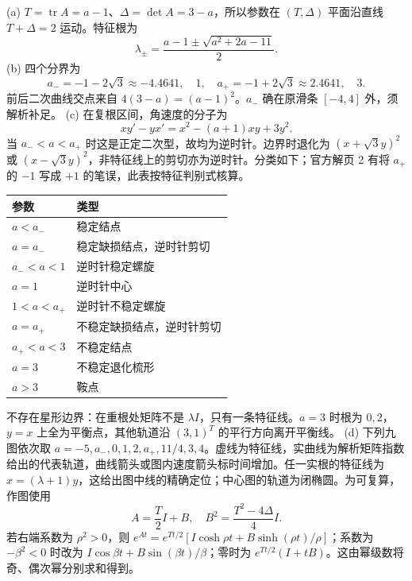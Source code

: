\begin{solution}
(a) $T=\operatorname{tr}A=a-1$、$\Delta=\det A=3-a$，所以参数在 $(T,\Delta)$ 平面沿直线 $T+\Delta=2$ 运动。特征根为
\[\lambda_\pm=\frac{a-1\pm\sqrt{a^2+2a-11}}2.\]
(b) 四个分界为
\[a_-= -1-2\sqrt3\approx-4.4641,\quad1,\quad a_+=-1+2\sqrt3\approx2.4641,\quad3.\]
前后二次曲线交点来自 $4(3-a)=(a-1)^2$。$a_-$ 确在原滑条 $[-4,4]$ 外，须解析补足。
(c) 在复根区间，角速度的分子为
\[xy'-yx'=x^2-(a+1)xy+3y^2.\]
当 $a_-<a<a_+$ 时这是正定二次型，故均为逆时针。边界时退化为 $(x+\sqrt3y)^2$ 或 $(x-\sqrt3y)^2$，非特征线上的剪切亦为逆时针。分类如下；官方解页 2 有将 $a_+$ 的 $-1$ 写成 $+1$ 的笔误，此表按特征判别式核算。
\begin{center}\begin{tabular}{ll}\toprule
参数&类型\\\midrule
$a<a_-$&稳定结点\\
$a=a_-$&稳定缺损结点，逆时针剪切\\
$a_-<a<1$&逆时针稳定螺旋\\
$a=1$&逆时针中心\\
$1<a<a_+$&逆时针不稳定螺旋\\
$a=a_+$&不稳定缺损结点，逆时针剪切\\
$a_+<a<3$&不稳定结点\\
$a=3$&不稳定退化梳形\\
$a>3$&鞍点\\\bottomrule\end{tabular}\end{center}
不存在星形边界：在重根处矩阵不是 $\lambda I$，只有一条特征线。$a=3$ 时根为 $0,2$，$y=x$ 上全为平衡点，其他轨道沿 $(3,1)^T$ 的平行方向离开平衡线。
(d) 下列九图依次取 $a=-5,a_-,0,1,2,a_+,11/4,3,4$。虚线为特征线，实曲线为解析矩阵指数给出的代表轨道，曲线箭头或图内速度箭头标时间增加。任一实根的特征线为 $x=(\lambda+1)y$，这给出图中线的精确定位；中心图的轨道为闭椭圆。为可复算，作图使用
\[A=\frac T2I+B,\quad B^2=\frac{T^2-4\Delta}{4}I.\]
若右端系数为 $\rho^2>0$，则 $e^{At}=e^{Tt/2}[I\cosh\rho t+B\sinh(\rho t)/\rho]$；系数为 $-\beta^2<0$ 时改为 $I\cos\beta t+B\sin(\beta t)/\beta$；零时为 $e^{Tt/2}(I+tB)$。这由幂级数将奇、偶次幂分别求和得到。
\begin{center}
\end{center}
\end{solution}
